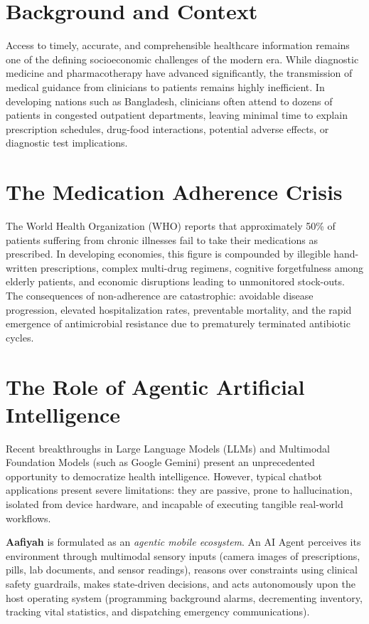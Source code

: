 \documentclass[12pt,a4paper,oneside]{report}
\begin{document}
\section{Background and Context}
Access to timely, accurate, and comprehensible healthcare information remains one of the defining socioeconomic challenges of the modern era. While diagnostic medicine and pharmacotherapy have advanced significantly, the transmission of medical guidance from clinicians to patients remains highly inefficient. In developing nations such as Bangladesh, clinicians often attend to dozens of patients in congested outpatient departments, leaving minimal time to explain prescription schedules, drug-food interactions, potential adverse effects, or diagnostic test implications.

\section{The Medication Adherence Crisis}
The World Health Organization (WHO) reports that approximately 50\% of patients suffering from chronic illnesses fail to take their medications as prescribed. In developing economies, this figure is compounded by illegible hand-written prescriptions, complex multi-drug regimens, cognitive forgetfulness among elderly patients, and economic disruptions leading to unmonitored stock-outs. The consequences of non-adherence are catastrophic: avoidable disease progression, elevated hospitalization rates, preventable mortality, and the rapid emergence of antimicrobial resistance due to prematurely terminated antibiotic cycles.

\section{The Role of Agentic Artificial Intelligence}
Recent breakthroughs in Large Language Models (LLMs) and Multimodal Foundation Models (such as Google Gemini) present an unprecedented opportunity to democratize health intelligence. However, typical chatbot applications present severe limitations: they are passive, prone to hallucination, isolated from device hardware, and incapable of executing tangible real-world workflows. 

\textbf{Aafiyah} is formulated as an \textit{agentic mobile ecosystem}. An AI Agent perceives its environment through multimodal sensory inputs (camera images of prescriptions, pills, lab documents, and sensor readings), reasons over constraints using clinical safety guardrails, makes state-driven decisions, and acts autonomously upon the host operating system (programming background alarms, decrementing inventory, tracking vital statistics, and dispatching emergency communications).
\end{document}
